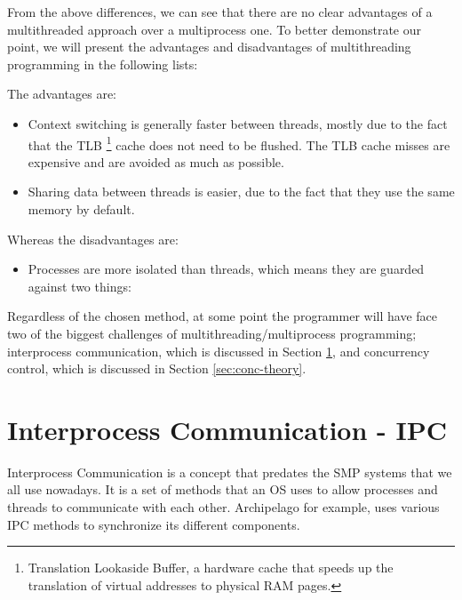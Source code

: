 From the above differences, we can see that there are no clear advantages of a 
multithreaded approach over a multiprocess one. To better demonstrate our 
point, we will present the advantages and disadvantages of multithreading 
programming in the following lists:

The advantages are:

\begin{itemize}
	\item Context switching is generally faster between threads, mostly due 
		to the fact that the TLB
		\footnote{Translation Lookaside Buffer, a hardware cache that speeds up 
			the translation of virtual addresses to physical RAΜ pages.}
		cache does not need to be flushed. The TLB cache misses are 
		expensive and are avoided as much as possible\cite{tlb}.
	\item Sharing data between threads is easier, due to the fact that they 
		use the same memory by default.
\end{itemize}

Whereas the disadvantages are:

\begin{itemize}
	\item Processes are more isolated than threads, which means they are 
		guarded against two things:
\end{itemize}

Regardless of the chosen method, at some point the programmer will have face 
two of the biggest challenges of multithreading/multiprocess programming;
interprocess communication, which is discussed in Section \ref{sec:ipc-theory}, 
and concurrency control, which is discussed in Section \ref{sec:conc-theory}.

\section{Interprocess Communication - IPC}\label{sec:ipc-theory}

Interprocess Communication is a concept that predates the SMP systems that we 
all use nowadays. It is a set of methods that an OS uses to allow processes and 
threads to communicate with each other. Archipelago for example, uses various 
IPC methods to synchronize its different components.


